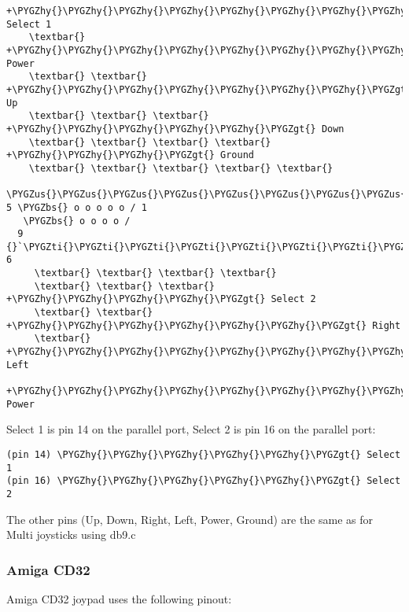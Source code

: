 \documentclass[a4paper,8pt,english]{sphinxmanual}
\def\PYGZbs{\char`\\}
\def\PYGZus{\char`\_}
\def\PYGZgt{\char`\>}
\def\PYGZhy{\char`\-}
\def\PYGZsq{\char`\'}
\def\PYGZti{\char`\~}
\renewcommand\PYGZsq{\textquotesingle}
\begin{document}
\begin{Verbatim}[commandchars=\\\{\}]
    +\PYGZhy{}\PYGZhy{}\PYGZhy{}\PYGZhy{}\PYGZhy{}\PYGZhy{}\PYGZhy{}\PYGZhy{}\PYGZhy{}\PYGZhy{}\PYGZhy{}\PYGZgt{} Select 1
    \textbar{} +\PYGZhy{}\PYGZhy{}\PYGZhy{}\PYGZhy{}\PYGZhy{}\PYGZhy{}\PYGZhy{}\PYGZhy{}\PYGZhy{}\PYGZgt{} Power
    \textbar{} \textbar{} +\PYGZhy{}\PYGZhy{}\PYGZhy{}\PYGZhy{}\PYGZhy{}\PYGZhy{}\PYGZhy{}\PYGZgt{} Up
    \textbar{} \textbar{} \textbar{} +\PYGZhy{}\PYGZhy{}\PYGZhy{}\PYGZhy{}\PYGZhy{}\PYGZgt{} Down
    \textbar{} \textbar{} \textbar{} \textbar{} +\PYGZhy{}\PYGZhy{}\PYGZhy{}\PYGZgt{} Ground
    \textbar{} \textbar{} \textbar{} \textbar{} \textbar{}
  \PYGZus{}\PYGZus{}\PYGZus{}\PYGZus{}\PYGZus{}\PYGZus{}\PYGZus{}\PYGZus{}\PYGZus{}\PYGZus{}\PYGZus{}\PYGZus{}\PYGZus{}
5 \PYGZbs{} o o o o o / 1
   \PYGZbs{} o o o o /
  9 {}`\PYGZti{}\PYGZti{}\PYGZti{}\PYGZti{}\PYGZti{}\PYGZti{}\PYGZti{}\PYGZsq{} 6
     \textbar{} \textbar{} \textbar{} \textbar{}
     \textbar{} \textbar{} \textbar{} +\PYGZhy{}\PYGZhy{}\PYGZhy{}\PYGZhy{}\PYGZgt{} Select 2
     \textbar{} \textbar{} +\PYGZhy{}\PYGZhy{}\PYGZhy{}\PYGZhy{}\PYGZhy{}\PYGZhy{}\PYGZgt{} Right
     \textbar{} +\PYGZhy{}\PYGZhy{}\PYGZhy{}\PYGZhy{}\PYGZhy{}\PYGZhy{}\PYGZhy{}\PYGZhy{}\PYGZgt{} Left
     +\PYGZhy{}\PYGZhy{}\PYGZhy{}\PYGZhy{}\PYGZhy{}\PYGZhy{}\PYGZhy{}\PYGZhy{}\PYGZhy{}\PYGZhy{}\PYGZgt{} Power
\end{Verbatim}

Select 1 is pin 14 on the parallel port, Select 2 is pin 16 on the
parallel port:

\begin{Verbatim}[commandchars=\\\{\}]
(pin 14) \PYGZhy{}\PYGZhy{}\PYGZhy{}\PYGZhy{}\PYGZhy{}\PYGZgt{} Select 1
(pin 16) \PYGZhy{}\PYGZhy{}\PYGZhy{}\PYGZhy{}\PYGZhy{}\PYGZgt{} Select 2
\end{Verbatim}

The other pins (Up, Down, Right, Left, Power, Ground) are the same as for
Multi joysticks using db9.c


\subsubsection{Amiga CD32}
\label{input/devices/joystick-parport:amiga-cd32}
Amiga CD32 joypad uses the following pinout:
\end{document}
